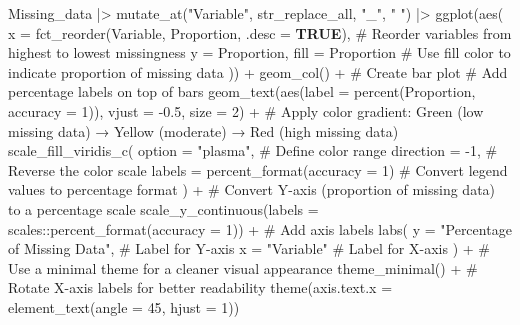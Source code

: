 \documentclass[
  bookmarksnumbered]{article}
\newenvironment{Shaded}{\begin{snugshade}}{\end{snugshade}}
\newcommand{\AttributeTok}[1]{\textcolor[rgb]{0.80,0.80,0.80}{#1}}
\newcommand{\CommentTok}[1]{\textcolor[rgb]{0.50,0.62,0.50}{#1}}
\newcommand{\ConstantTok}[1]{\textcolor[rgb]{0.86,0.64,0.64}{\textbf{#1}}}
\newcommand{\DecValTok}[1]{\textcolor[rgb]{0.86,0.86,0.80}{#1}}
\newcommand{\FloatTok}[1]{\textcolor[rgb]{0.75,0.75,0.82}{#1}}
\newcommand{\FunctionTok}[1]{\textcolor[rgb]{0.94,0.94,0.56}{#1}}
\newcommand{\NormalTok}[1]{\textcolor[rgb]{0.80,0.80,0.80}{#1}}
\newcommand{\SpecialCharTok}[1]{\textcolor[rgb]{0.86,0.64,0.64}{#1}}
\newcommand{\StringTok}[1]{\textcolor[rgb]{0.80,0.58,0.58}{#1}}
\begin{document}
\begin{Shaded}
\begin{Highlighting}[]
\NormalTok{Missing\_data }\SpecialCharTok{|\textgreater{}} 
  \FunctionTok{mutate\_at}\NormalTok{(}\StringTok{"Variable"}\NormalTok{, str\_replace\_all, }\StringTok{"\_"}\NormalTok{, }\StringTok{" "}\NormalTok{) }\SpecialCharTok{|\textgreater{}} 
  \FunctionTok{ggplot}\NormalTok{(}\FunctionTok{aes}\NormalTok{(}
    \AttributeTok{x =} \FunctionTok{fct\_reorder}\NormalTok{(Variable, Proportion, }\AttributeTok{.desc =} \ConstantTok{TRUE}\NormalTok{), }\CommentTok{\# Reorder variables from highest to lowest missingness}
    \AttributeTok{y =}\NormalTok{ Proportion,}
    \AttributeTok{fill =}\NormalTok{ Proportion  }\CommentTok{\# Use fill color to indicate proportion of missing data}
\NormalTok{  )) }\SpecialCharTok{+}
  \FunctionTok{geom\_col}\NormalTok{() }\SpecialCharTok{+}  \CommentTok{\# Create bar plot}
  \CommentTok{\# Add percentage labels on top of bars}
  \FunctionTok{geom\_text}\NormalTok{(}\FunctionTok{aes}\NormalTok{(}\AttributeTok{label =} \FunctionTok{percent}\NormalTok{(Proportion, }\AttributeTok{accuracy =} \DecValTok{1}\NormalTok{)),  }
            \AttributeTok{vjust =} \SpecialCharTok{{-}}\FloatTok{0.5}\NormalTok{, }\AttributeTok{size =} \DecValTok{2}\NormalTok{) }\SpecialCharTok{+}
  \CommentTok{\# Apply color gradient: Green (low missing data) → Yellow (moderate) → Red (high missing data)}
  \FunctionTok{scale\_fill\_viridis\_c}\NormalTok{(}
    \AttributeTok{option =} \StringTok{"plasma"}\NormalTok{,  }\CommentTok{\# Define color range}
    \AttributeTok{direction =} \SpecialCharTok{{-}}\DecValTok{1}\NormalTok{,  }\CommentTok{\# Reverse the color scale}
    \AttributeTok{labels =} \FunctionTok{percent\_format}\NormalTok{(}\AttributeTok{accuracy =} \DecValTok{1}\NormalTok{)  }\CommentTok{\# Convert legend values to percentage format}
\NormalTok{  ) }\SpecialCharTok{+} 
  \CommentTok{\# Convert Y{-}axis (proportion of missing data) to a percentage scale}
  \FunctionTok{scale\_y\_continuous}\NormalTok{(}\AttributeTok{labels =}\NormalTok{ scales}\SpecialCharTok{::}\FunctionTok{percent\_format}\NormalTok{(}\AttributeTok{accuracy =} \DecValTok{1}\NormalTok{)) }\SpecialCharTok{+}
  \CommentTok{\# Add axis labels}
  \FunctionTok{labs}\NormalTok{(}
    \AttributeTok{y =} \StringTok{"Percentage of Missing Data"}\NormalTok{,  }\CommentTok{\# Label for Y{-}axis}
    \AttributeTok{x =} \StringTok{"Variable"}  \CommentTok{\# Label for X{-}axis}
\NormalTok{  ) }\SpecialCharTok{+}
  \CommentTok{\# Use a minimal theme for a cleaner visual appearance}
  \FunctionTok{theme\_minimal}\NormalTok{() }\SpecialCharTok{+}
  \CommentTok{\# Rotate X{-}axis labels for better readability}
  \FunctionTok{theme}\NormalTok{(}\AttributeTok{axis.text.x =} \FunctionTok{element\_text}\NormalTok{(}\AttributeTok{angle =} \DecValTok{45}\NormalTok{, }\AttributeTok{hjust =} \DecValTok{1}\NormalTok{))}
\end{Highlighting}
\end{Shaded}
\end{document}
